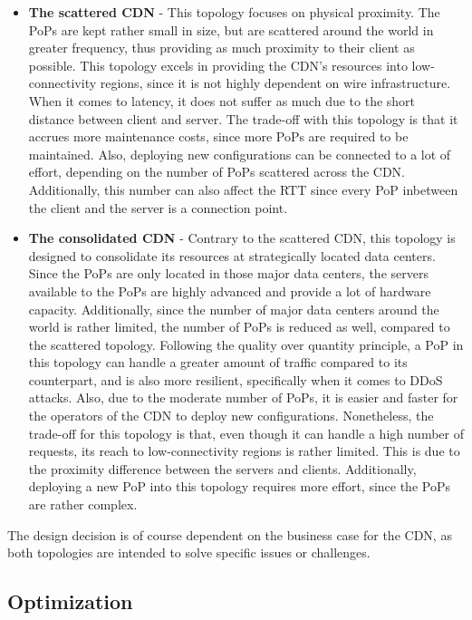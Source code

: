 \begin{itemize}
	\item \textbf{The scattered CDN} - This topology focuses on physical proximity. The PoPs are kept rather small in size, but are scattered around the world in greater frequency, thus providing as much proximity to their client as possible. This topology excels in providing the CDN's resources into low-connectivity regions, since it is not highly dependent on wire infrastructure. When it comes to latency, it does not suffer as much due to the short distance between client and server. The trade-off with this topology is that it accrues more maintenance costs, since more PoPs are required to be maintained. Also, deploying new configurations can be connected to a lot of effort, depending on the number of PoPs scattered across the CDN. 
	Additionally, this number can also affect the RTT since every PoP inbetween the client and the server is a connection point.
	
	\item \textbf{The consolidated CDN} - Contrary to the scattered CDN, this topology is designed to consolidate its resources at strategically located data centers. Since the PoPs are only located in those major data centers, the servers available to the PoPs are highly advanced and provide a lot of hardware capacity. Additionally, since the number of major data centers around the world is rather limited, the number of PoPs is reduced as well, compared to the scattered topology. Following the quality over quantity principle, a PoP in this topology can handle a greater amount of traffic compared to its counterpart, and is also more resilient, specifically when it comes to DDoS attacks. Also, due to the moderate number of PoPs, it is easier and faster for the operators of the CDN to deploy new configurations.
	Nonetheless, the trade-off for this topology is that, even though it can handle a high number of requests, its reach to low-connectivity regions is rather limited. This is due to the proximity difference between the servers and clients. Additionally, deploying a new PoP into this topology requires more effort, since the PoPs are rather complex.	
\end{itemize}

The design decision is of course dependent on the business case for the CDN, as both topologies are intended to solve specific issues or challenges. \cite{cdn_architecture} 

\subsection{Optimization}

